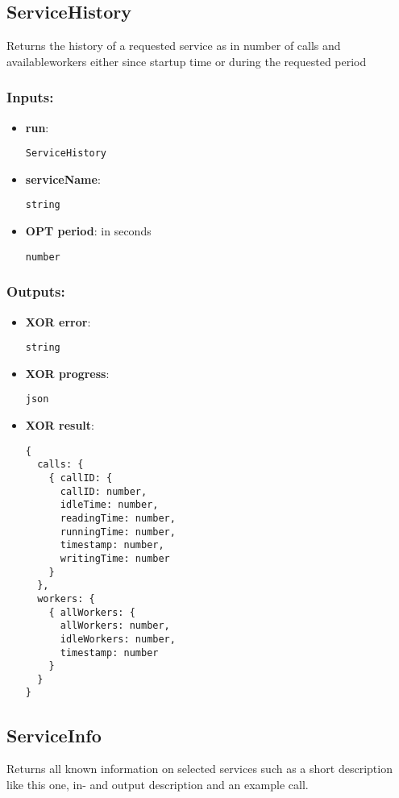 \subsection{ServiceHistory}
\label{ch:builtinservices:ServiceHistory}
Returns
 the history of a requested service as in number of calls and 
availableworkers either since startup time or during the requested 
period
\subsubsection*{Inputs:}
\begin{itemize}
  \small
    \item \textbf{run}: 
\begin{lstlisting}
ServiceHistory
\end{lstlisting}
    \item \textbf{serviceName}: 
\begin{lstlisting}
string
\end{lstlisting}
    \item \textbf{OPT period}: in seconds
\begin{lstlisting}
number
\end{lstlisting}
  \end{itemize}
\subsubsection*{Outputs:}
\begin{itemize}
  \small
    \item \textbf{XOR error}: 
\begin{lstlisting}
string
\end{lstlisting}
    \item \textbf{XOR progress}: 
\begin{lstlisting}
json
\end{lstlisting}
    \item \textbf{XOR result}: 
\begin{lstlisting}
{
  calls: {
    { callID: {
      callID: number, 
      idleTime: number, 
      readingTime: number, 
      runningTime: number, 
      timestamp: number, 
      writingTime: number
    }
  }, 
  workers: {
    { allWorkers: {
      allWorkers: number, 
      idleWorkers: number, 
      timestamp: number
    }
  }
}
\end{lstlisting}
  \end{itemize}

\subsection{ServiceInfo}
\label{ch:builtinservices:ServiceInfo}
Returns
 all known information on selected services such as a short description 
like this one, in- and output description and an example call. 
